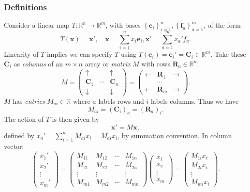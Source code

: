 \documentclass[a4paper]{article}
\begin{document}
\subsubsection{Definitions}
Consider a linear map $ T:\mathbb{R}^{n}\to \mathbb{R}^{m} $, with
bases $ \left\{ \mathbf{e}_i\right\}_{i=1}^n, \left\{
\mathbf{f}_a\right\}_{a=1}^m $, of the form
\[
  T(\mathbf{x})=\mathbf{x}',\quad \mathbf{x}=\sum_{i=1}^{n}x_i
  \mathbf{e}_i, \mathbf{x}'=\sum_{a=1}^{m} x_a' f_a
.\]
Linearity of $T$ implies we can specify $T$ using $
T(\mathbf{e}_i)=\mathbf{e}_i'=\mathbf{C}_i\in \mathbb{R}^{m} $. Take
these $ \mathbf{C}_i $ as \textit{columns} of an $ m \times n $ array
or \textit{matrix} $M$ with rows $ \mathbf{R}_a\in \mathbb{R}^{n} $.
\[
  M=
  \begin{pmatrix}
    \uparrow & & \uparrow \\
    \mathbf{C}_1 & \cdots & \mathbf{C}_n\\
    \downarrow & & \downarrow
  \end{pmatrix}=
  \begin{pmatrix}
    \leftarrow & \mathbf{R}_1 & \rightarrow \\
    &\cdots &\\
    \leftarrow & \mathbf{R}_{m} & \rightarrow
  \end{pmatrix}
.\]
$M$ has \textit{entries} $ M_{ai}\in \mathbb{R} $ where $a$ labels
rows and $i$ labels columns. Thus we have
\[
  M_{ai} = (\mathbf{C}_i)_a=(\mathbf{R}_a)_i
.\]
The action of $T$ is then given by
\[
  \mathbf{x}'=M \mathbf{x}
,\]
defined by $ x_a'=\sum_{i=1}^{n}M_{ai}x_i = M_{ai}x_i $, by summation
convention. In column vector:
\[
  \begin{pmatrix}
    x_1'\\x_2'\\\vdots\\x_m'
  \end{pmatrix}=
  \begin{pmatrix}
    M_{11}&M_{12}&\cdots&M_{1n}\\
    M_{21}&M_{22}&\cdots&M_{2n}\\
    \vdots&\vdots&&\vdots\\
    M_{m1}&M_{m2}&\cdots&M_{mn}
  \end{pmatrix}
  \begin{pmatrix}
    x_1\\x_2\\\vdots\\x_m
  \end{pmatrix}=
  \begin{pmatrix}
    M_{1i}x_i\\M_{2i}x_i\\\vdots\\M_{mi}x_i
  \end{pmatrix}
.\]
\end{document}
